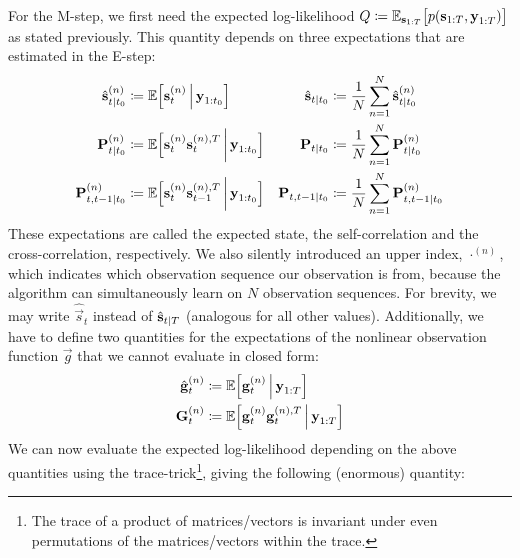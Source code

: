 	For the M-step, we first need the expected log-likelihood \( Q \coloneqq \mathbb{E}_{\boldsymbol{\mathrm{s}}_{1:T}}\big[ p(\boldsymbol{\mathrm{s}}_{1:T}, \boldsymbol{\mathrm{y}}_{1:T}) \big] \) as stated previously. This quantity depends on three expectations that are estimated in the E-step:
	\begin{align}
		\hat{\boldsymbol{\mathrm{s}}}_{t \vert t_0}^{(n)}  &\coloneqq \mathbb{E}\Big[\boldsymbol{\mathrm{s}}_t^{(n)} \,\Big\vert\, \boldsymbol{\mathrm{y}}_{1:t_0}\Big]                             & \hat{\boldsymbol{\mathrm{s}}}_{t \vert t_0}           & \coloneqq \frac{1}{N} \sum_{n = 1}^{N} \hat{\boldsymbol{\mathrm{s}}}_{t \vert t_0}^{(n)}  \label{eq:stateSmoothed} \\
		\boldsymbol{\mathrm{P}}_{t \vert t_0}^{(n)}        &\coloneqq \mathbb{E}\Big[\boldsymbol{\mathrm{s}}_t^{(n)} \boldsymbol{\mathrm{s}}_t^{(n), T} \,\bigg\vert\, \boldsymbol{\mathrm{y}}_{1:t_0}\Big]       & \boldsymbol{\mathrm{P}}_{t \vert t_0}        & \coloneqq \frac{1}{N} \sum_{n = 1}^{N} \boldsymbol{\mathrm{P}}_{t \vert t_0}^{(n)}  \label{eq:selfCorrelation} \\
		\boldsymbol{\mathrm{P}}_{t, t - 1 \vert t_0}^{(n)} &\coloneqq \mathbb{E}\Big[\boldsymbol{\mathrm{s}}_t^{(n)} \boldsymbol{\mathrm{s}}_{t - 1}^{(n), T} \,\bigg\vert\, \boldsymbol{\mathrm{y}}_{1:t_0}\Big] & \boldsymbol{\mathrm{P}}_{t, t - 1 \vert t_0} & \coloneqq \frac{1}{N} \sum_{n = 1}^{N} \boldsymbol{\mathrm{P}}_{t, t - 1 \vert t_0}^{(n)}  \label{eq:crossCorrelation}
	\end{align}
	These expectations are called the expected state, the self-correlation and the cross-correlation, respectively. We also silently introduced an upper index, \( \cdot^{(n)} \), which indicates which observation sequence our observation is from, because the algorithm can simultaneously learn on \(N\) observation sequences. For brevity, we may write \( \hat{\vec{s}}_t \) instead of \( \hat{\boldsymbol{\mathrm{s}}}_{t \vert T} \) (analogous for all other values). Additionally, we have to define two quantities for the expectations of the nonlinear observation function \( \vec{g} \) that we cannot evaluate in closed form:
	\begin{align}
		\hat{\boldsymbol{\mathrm{g}}}_t^{(n)} &\coloneqq \mathbb{E}\Big[\boldsymbol{\mathrm{g}}_t^{(n)} \,\Big\vert\, \boldsymbol{\mathrm{y}}_{1:T}\Big]  \label{eq:expectedMeasurement} \\
		\boldsymbol{\mathrm{G}}_t^{(n)}       &\coloneqq \mathbb{E}\Big[\boldsymbol{\mathrm{g}}_t^{(n)} \boldsymbol{\mathrm{g}}_t^{(n), T} \,\Big\vert\, \boldsymbol{\mathrm{y}}_{1:T}\Big]  \label{eq:expectedMeasurementMat}
	\end{align}
	We can now evaluate the expected log-likelihood depending on the above quantities using the trace-trick\footnote{The trace of a product of matrices/vectors is invariant under even permutations of the matrices/vectors within the trace.}, giving the following (enormous) quantity:
